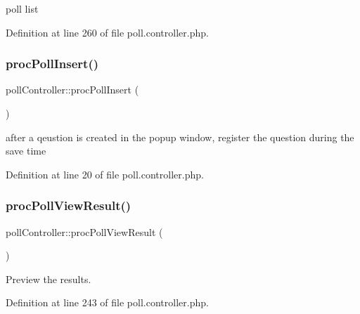 poll list 



Definition at line 260 of file poll.\+controller.\+php.

\mbox{\label{classpollController_a22722ed2a0810a54f9abfd098cd3d25c}} 
\subsubsection{\texorpdfstring{proc\+Poll\+Insert()}{procPollInsert()}}
{\footnotesize\ttfamily poll\+Controller\+::proc\+Poll\+Insert (\begin{DoxyParamCaption}{ }\end{DoxyParamCaption})}



after a qeustion is created in the popup window, register the question during the save time 



Definition at line 20 of file poll.\+controller.\+php.

\mbox{\label{classpollController_a0fedbcad279a12cdf95a0f1d878bbfea}} 
\subsubsection{\texorpdfstring{proc\+Poll\+View\+Result()}{procPollViewResult()}}
{\footnotesize\ttfamily poll\+Controller\+::proc\+Poll\+View\+Result (\begin{DoxyParamCaption}{ }\end{DoxyParamCaption})}



Preview the results. 



Definition at line 243 of file poll.\+controller.\+php.

\mbox{\label{classpollController_a9a22d9c1e70e7fdf3d635cc4e02fe8f7}} 
